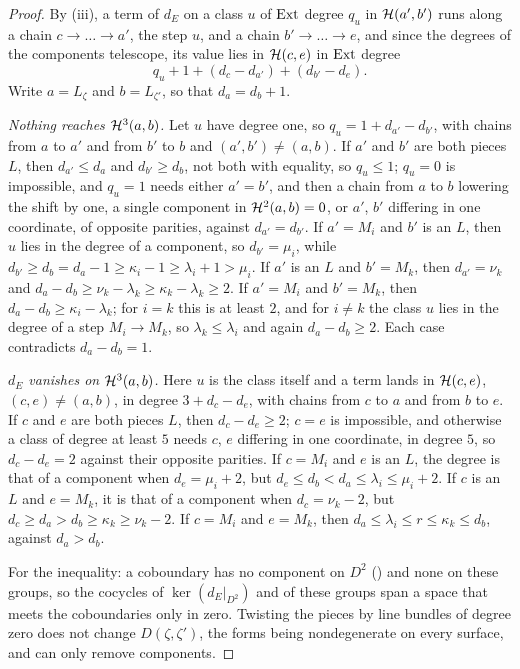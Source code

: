 \begin{proof}
By (iii), a term of $d_{E}$ on a class $u$ of $\operatorname{Ext}$
degree $q_{u}$ in $\mathcal{H}(a',b')$ runs along a chain $c\to\dots\to a'$, the
step $u$, and a chain $b'\to\dots\to e$, and since the degrees of the
components telescope, its value lies in $\mathcal{H}(c,e)$ in $\operatorname{Ext}$ degree
\[
  q_{u}+1+(d_{c}-d_{a'})+(d_{b'}-d_{e}).
\]
Write $a=L_{\zeta}$ and $b=L_{\zeta'}$, so that $d_{a}=d_{b}+1$.

\emph{Nothing reaches $\mathcal{H}^{3}(a,b)$.} Let $u$ have degree one, so
$q_{u}=1+d_{a'}-d_{b'}$, with chains from $a$ to $a'$ and from $b'$ to $b$
and $(a',b')\ne(a,b)$. If $a'$ and $b'$ are both pieces $L$, then
$d_{a'}\le d_{a}$ and $d_{b'}\ge d_{b}$, not both with equality, so
$q_{u}\le1$; $q_{u}=0$ is impossible, and $q_{u}=1$ needs either $a'=b'$, and
then a chain from $a$ to $b$ lowering the shift by one, a single component in
$\mathcal{H}^{2}(a,b)=0$, or $a'$, $b'$ differing in one coordinate, of opposite
parities, against $d_{a'}=d_{b'}$. If $a'=M_{i}$ and $b'$ is an $L$, then
$u$ lies in the degree of a component, so $d_{b'}=\mu_{i}$, while
$d_{b'}\ge d_{b}=d_{a}-1\ge\kappa_{i}-1\ge\lambda_{i}+1>\mu_{i}$. If $a'$ is
an $L$ and $b'=M_{k}$, then $d_{a'}=\nu_{k}$ and
$d_{a}-d_{b}\ge\nu_{k}-\lambda_{k}\ge\kappa_{k}-\lambda_{k}\ge2$. If
$a'=M_{i}$ and $b'=M_{k}$, then $d_{a}-d_{b}\ge\kappa_{i}-\lambda_{k}$; for
$i=k$ this is at least $2$, and for $i\ne k$ the class $u$ lies in the
degree of a step $M_{i}\to M_{k}$, so $\lambda_{k}\le\lambda_{i}$ and again
$d_{a}-d_{b}\ge2$. Each case contradicts $d_{a}-d_{b}=1$.

\emph{$d_{E}$ vanishes on $\mathcal{H}^{3}(a,b)$.} Here $u$ is the class itself and a
term lands in $\mathcal{H}(c,e)$, $(c,e)\ne(a,b)$, in degree $3+d_{c}-d_{e}$, with
chains from $c$ to $a$ and from $b$ to $e$. If $c$ and $e$ are both pieces
$L$, then $d_{c}-d_{e}\ge2$; $c=e$ is impossible, and otherwise a class of
degree at least $5$ needs $c$, $e$ differing in one coordinate, in degree
$5$, so $d_{c}-d_{e}=2$ against their opposite parities. If $c=M_{i}$ and
$e$ is an $L$, the degree is that of a component when $d_{e}=\mu_{i}+2$, but
$d_{e}\le d_{b}<d_{a}\le\lambda_{i}\le\mu_{i}+2$. If $c$ is an $L$ and
$e=M_{k}$, it is that of a component when $d_{c}=\nu_{k}-2$, but
$d_{c}\ge d_{a}>d_{b}\ge\kappa_{k}\ge\nu_{k}-2$. If $c=M_{i}$ and
$e=M_{k}$, then $d_{a}\le\lambda_{i}\le r\le\kappa_{k}\le d_{b}$, against
$d_{a}>d_{b}$.

For the inequality: a coboundary has no component on $D^{2}$
() and none on these groups, so the cocycles of
$\ker(d_{E}|_{D^{2}})$ and of these groups span a space that meets the
coboundaries only in zero. Twisting the pieces by line bundles of degree
zero does not change $D(\zeta,\zeta')$, the forms being nondegenerate on
every surface, and can only remove components.
\end{proof}


